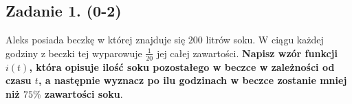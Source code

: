 \subsection*{Zadanie 1. (0-2)}
Aleks posiada beczkę w której znajduje się $200$ litrów soku. W ciągu każdej godziny z beczki tej wyparowuje $\frac{1}{20}$ jej całej zawartości. \textbf{Napisz wzór funkcji $i(t)$, która opisuje ilość soku pozostałego w beczce w zależności od czasu $t$, a następnie wyznacz po ilu godzinach w beczce zostanie mniej niż $75\%$ zawartości soku}.